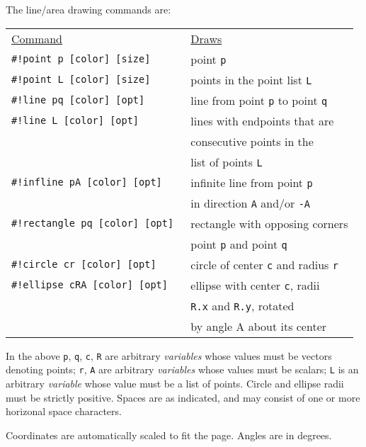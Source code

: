 \documentclass[12pt]{article}
\begin{document}
\begin{minipage}{\textwidth}
The line/area drawing commands are:
\\[1ex]
\begin{tabular}{@{}l@{~~~~~}l@{}}
\underline{Command} & \underline{Draws}
\\[1ex]
\tt \#!point p [color] [size] & point {\tt p} \\
\tt \#!point L [color] [size] & points in the point list {\tt L} \\
\tt \#!line pq [color] [opt] & line from point {\tt p}
                                 to point {\tt q} \\
\tt \#!line L  [color] [opt] & lines with endpoints that are \\
                             & consecutive points in the \\
		             & list of points {\tt L} \\
\tt \#!infline pA [color] [opt] & infinite line from point {\tt p} \\
                                & in direction {\tt A} and/or {\tt -A} \\
\tt \#!rectangle pq [color] [opt] & rectangle with opposing corners \\
                                  & point {\tt p} and point {\tt q} \\
\tt \#!circle cr [color] [opt] & circle of center {\tt c}
                                   and radius {\tt r} \\
\tt \#!ellipse cRA [color] [opt] & ellipse with center {\tt c}, radii \\
                                   & {\tt R.x} and {\tt R.y}, rotated \\
                                   & by angle A about its center \\
\end{tabular}
\end{minipage}

In the above {\tt p}, {\tt q}, {\tt c}, {\tt R}
are arbitrary {\em variables} whose
values must be vectors denoting points; {\tt r}, {\tt A} are arbitrary
{\em variables} whose values must be scalars;
{\tt L} is an arbitrary {\em variable} whose value must be a list of points.
Circle and ellipse radii must be strictly positive.
Spaces are as indicated, and may consist
of one or more horizonal space characters.

Coordinates are automatically scaled to fit the page.  Angles are
in degrees.
\end{document}
